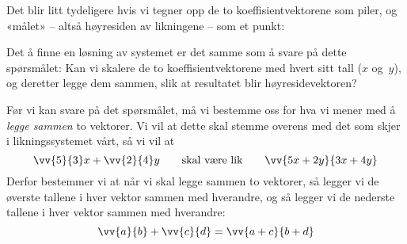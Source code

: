 Det blir litt tydeligere hvis vi tegner opp de to koeffisientvektorene
som piler, og «målet» -- altså høyresiden av likningene -- som et punkt:
\begin{center}
\end{center}
Det å finne en løsning av systemet er det samme som å svare på dette
spørsmålet: Kan vi skalere de to koeffisientvektorene med hvert sitt
tall ($x$ og~$y$), og deretter legge dem sammen, slik at resultatet
blir høyresidevektoren?

Før vi kan svare på det spørsmålet, må vi bestemme oss for hva vi
mener med å \emph{legge sammen} to vektorer.  Vi vil at dette skal
stemme overens med det som skjer i likningssystemet vårt, så vi vil at
\[
\vv{5}{3} x + \vv{2}{4} y
\qquad\text{skal være lik}\qquad
\vv{5x + 2y}{3x + 4y}
\]
Derfor bestemmer vi at når vi skal legge sammen to vektorer, så legger
vi de øverste tallene i hver vektor sammen med hverandre, og så legger
vi de nederste tallene i hver vektor sammen med hverandre:
\[
\vv{a}{b} + \vv{c}{d} = \vv{a+c}{b+d}
\]

